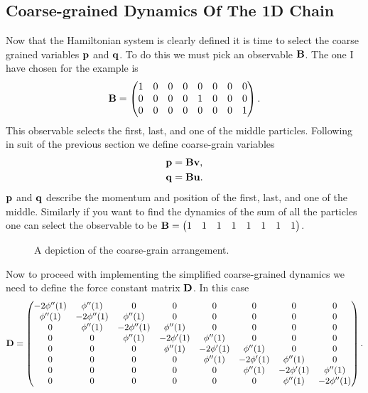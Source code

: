 \subsection{Coarse-grained Dynamics Of The 1D Chain}
Now that the Hamiltonian system is clearly defined it is time to select the coarse grained variables $\mathbf{p}$ and $\mathbf{q}$. To do this we must pick an observable $\mathbf{B}$. The one I have chosen for the example is  
\begin{align*}
\mathbf{B}=
\begin{pmatrix}
1 & 0 &0  &0  &0  &0  &0  & 0\\ 
 0& 0 &0  &0  &1  &0  &0  &0 \\ 
 0&  0&0  & 0 &0  &0  & 0 & 1
\end{pmatrix}.
\end{align*}
This observable selects the first, last, and one of the middle particles. Following in suit of the previous section we define coarse-grain variables 
\begin{align*}
\mathbf{p} &= \mathbf{B}\mathbf{v},\\
\mathbf{q} &=\mathbf{B}\mathbf{u}.
\end{align*}
$\mathbf{p}$ and $\mathbf{q}$ describe the momentum and position of the first, last, and one of the middle. Similarly if you want to find the dynamics of the sum of all the particles one can select the observable to be $\mathbf{B}=\begin{pmatrix}
1 & 1 & 1 & 1 & 1 & 1 & 1 & 1
\end{pmatrix}$.\\


\begin{figure}[h]
\centering
\def\svgscale{0.35}

\caption{A depiction of the coarse-grain arrangement.} \label{figure:3}
\end{figure}


Now to proceed with implementing the simplified coarse-grained dynamics we need to define the force constant matrix $\mathbf{D}$. In this case 
\begin{align*}
\mathbf{D} = \begin{pmatrix}
 -2\phi''(1)& \phi''(1)  &0  & 0 &0  &0  &0  &0 \\ 
 \phi''(1)& -2\phi''(1)  & \phi''(1) & 0 &0  &0  &0 &0\\ 
0 & \phi''(1) & -2\phi''(1) &\phi''(1)  &0  &0  &0  &0 \\ 
 0&0  & \phi''(1) &  -2\phi'(1)&\phi''(1)  & 0 & 0 &0 \\ 
 0&0  &0  &\phi''(1) &  -2\phi'(1)&\phi''(1)&0  &0 \\ 
 0& 0 & 0 & 0 & \phi''(1) &  -2\phi'(1)&\phi''(1) & 0\\ 
 0& 0 & 0 &  0& 0 & \phi''(1) &  -2\phi'(1)&\phi''(1) \\ 
 0& 0 & 0 & 0 & 0 & 0&\phi''(1) & -2\phi''(1)  
\end{pmatrix}.
\end{align*}

